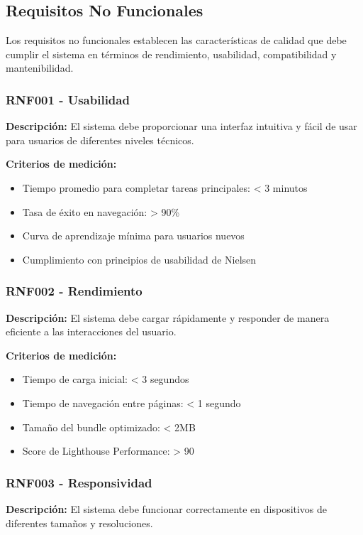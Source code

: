 \subsection{Requisitos No Funcionales}

Los requisitos no funcionales establecen las características de calidad que debe cumplir el sistema en términos de rendimiento, usabilidad, compatibilidad y mantenibilidad.

\subsubsection{RNF001 - Usabilidad}
\textbf{Descripción:} El sistema debe proporcionar una interfaz intuitiva y fácil de usar para usuarios de diferentes niveles técnicos.

\textbf{Criterios de medición:}
\begin{itemize}
    \item Tiempo promedio para completar tareas principales: < 3 minutos
    \item Tasa de éxito en navegación: > 90\%
    \item Curva de aprendizaje mínima para usuarios nuevos
    \item Cumplimiento con principios de usabilidad de Nielsen
\end{itemize}

\subsubsection{RNF002 - Rendimiento}
\textbf{Descripción:} El sistema debe cargar rápidamente y responder de manera eficiente a las interacciones del usuario.

\textbf{Criterios de medición:}
\begin{itemize}
    \item Tiempo de carga inicial: < 3 segundos
    \item Tiempo de navegación entre páginas: < 1 segundo
    \item Tamaño del bundle optimizado: < 2MB
    \item Score de Lighthouse Performance: > 90
\end{itemize}

\subsubsection{RNF003 - Responsividad}
\textbf{Descripción:} El sistema debe funcionar correctamente en dispositivos de diferentes tamaños y resoluciones.

